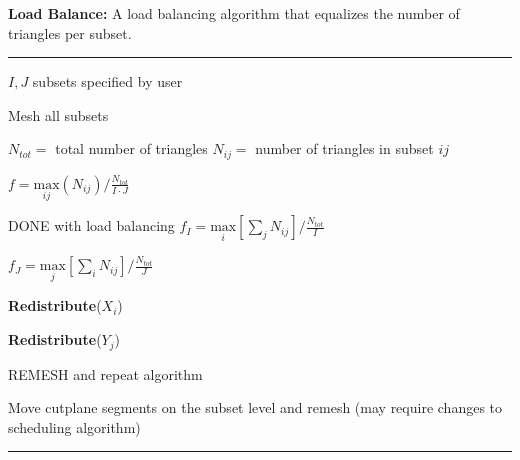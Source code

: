 \documentclass[11pt, letterpaper,titlepage,oneside]{article}
\begin{document}
\noindent\begin{minipage}{\textwidth}
\textbf{Load Balance:} A load balancing algorithm that equalizes the number of triangles per subset. \\
\rule{\textwidth}{0.4pt}
\begin{algorithmic}
\STATE  $I,J$ subsets specified by user

\STATE Mesh all subsets

\STATE  $N_{tot} = $ total number of triangles
\STATE  $N_{ij} = $ number of triangles in subset $ij$

\STATE $f =\underset{ij}{\text{max}}(N_{ij})/\frac{N_{tot}}{I\cdot J}$

	\STATE DONE with load balancing
\ELSE
	\STATE $f_I = \underset{i}{\text{max}}[\sum_{j} N_{ij}]/\frac{N_{tot}}{I}$
	
	\STATE $f_J = \underset{j}{\text{max}}[\sum_{i} N_{ij}]/\frac{N_{tot}}{J}$
	
		\STATE \textbf{Redistribute}($X_i$)
	\ENDIF
	
		\STATE \textbf{Redistribute}($Y_j$)
	\ENDIF 
	
		\STATE REMESH and repeat algorithm
	\ENDIF
	
\ENDIF

     \STATE Move cutplane segments on the subset level and remesh (may require changes to scheduling algorithm)
\ENDIF
\end{algorithmic}
\rule{\textwidth}{0.4pt}
\end{minipage}

\bigskip
\end{document}
